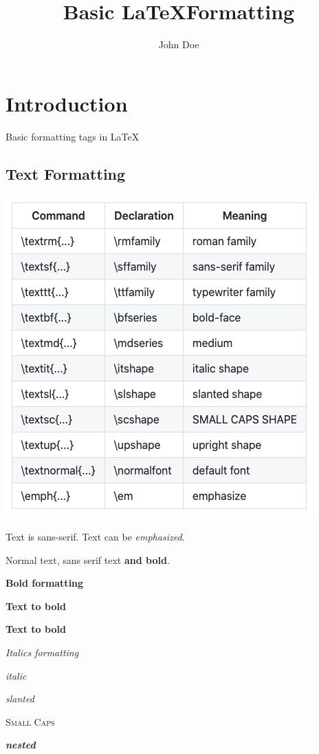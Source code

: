 \documentclass{article}
\title{Basic \LaTeX Formatting}
\author{John Doe}
\date{}
\begin{document}
\maketitle
\section{Introduction}

Basic formatting tags in \LaTeX

\subsection{Text Formatting}

\includegraphics[scale=0.5]{image/commands.png}

{\sffamily
	Text is sans-serif. Text can be {\em emphasized}.
}

Normal text, {\sffamily sans serif text {\bfseries and bold}}.

\textbf{Bold formatting}

{\bfseries Text to bold}

\bfseries Text to bold \mdseries

\emph{Italics formatting}

\textit{italic}

\textsl{slanted}

\textsc{Small Caps}

\textit{\textbf{nested}}
\end{document}
